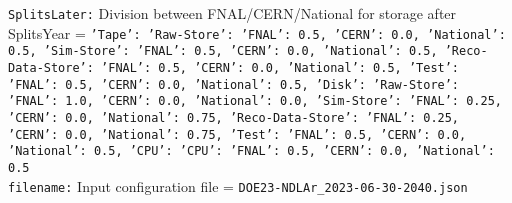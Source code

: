 {\tt SplitsLater:} Division between FNAL/CERN/National for storage after SplitsYear = {\tt {'Tape': {'Raw-Store': {'FNAL': 0.5, 'CERN': 0.0, 'National': 0.5}, 'Sim-Store': {'FNAL': 0.5, 'CERN': 0.0, 'National': 0.5}, 'Reco-Data-Store': {'FNAL': 0.5, 'CERN': 0.0, 'National': 0.5}, 'Test': {'FNAL': 0.5, 'CERN': 0.0, 'National': 0.5}}, 'Disk': {'Raw-Store': {'FNAL': 1.0, 'CERN': 0.0, 'National': 0.0}, 'Sim-Store': {'FNAL': 0.25, 'CERN': 0.0, 'National': 0.75}, 'Reco-Data-Store': {'FNAL': 0.25, 'CERN': 0.0, 'National': 0.75}, 'Test': {'FNAL': 0.5, 'CERN': 0.0, 'National': 0.5}}, 'CPU': {'CPU': {'FNAL': 0.5, 'CERN': 0.0, 'National': 0.5}}}} \\
{\tt filename:} Input configuration file = {\tt DOE23-NDLAr\_2023-06-30-2040.json} \\
